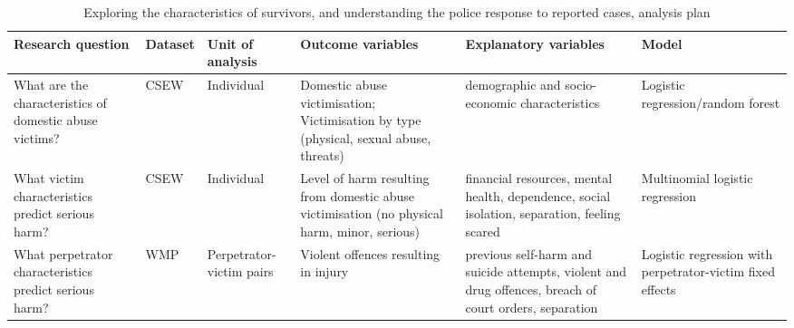 \documentclass[11pt, a4paper]{article}
\begin{document}
\begin{table*}
\caption{Exploring the characteristics of survivors, and understanding the police response to reported cases, analysis plan}
  \begin{threeparttable}[t]
  \centering
       \begin{tabular}{ L{2.4cm}  C{1.4cm}  C{1.5cm}  C{3.6cm}  C{3.1cm}  C{2.6cm} }
    \toprule
     \textbf{Research question} & \textbf{Dataset}    & \textbf{Unit of analysis} & \textbf{Outcome variables} & \textbf{Explanatory variables} & \textbf{Model} \\
    \midrule
    What are the characteristics of domestic abuse victims? & CSEW & Individual  & Domestic abuse victimisation; Victimisation by type (physical, sexual abuse, threats) & demographic and socio-economic characteristics & Logistic regression/random forest \\
           \midrule
    What victim characteristics predict serious harm? & CSEW & Individual  & Level of harm resulting from domestic abuse victimisation (no physical harm, minor, serious) & financial resources, mental health, dependence, social isolation, separation, feeling scared & Multinomial logistic regression \\
                \midrule
                    What perpetrator characteristics predict serious harm? & WMP & Perpetrator-victim pairs & Violent offences resulting in injury & previous self-harm and suicide attempts, violent and drug offences, breach of court orders, separation &  Logistic regression with perpetrator-victim fixed effects \\
     \bottomrule
  \end{tabular}
    \end{threeparttable}%
  \label{tab:addlabel}%
\end{table*}%
\end{document}
